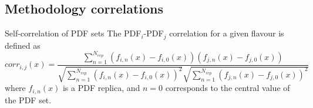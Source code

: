 \author[Roy Stegeman]{}
\subsection{Methodology correlations}

\begin{frame}[t]{Self-correlation of PDF sets}
The PDF$_i$-PDF$_j$ correlation for a given flavour is defined as
$$corr_{i,j}(x)= \frac{\sum_{n=1}^{N_{rep}} (f_{i,n}(x) -  f_{i,0}(x) )(f_{j,n}(x) -  f_{j,0}(x)) }{\sqrt{\sum_{n=1}^{N_{rep}}(f_{i,n}(x) - f_{i,0}(x))^2} \sqrt{\sum_{n=1}^{N_{rep}}(f_{j,n}(x) -  f_{j,0}(x))^2}}$$
where $f_{i,n}(x)$ is a PDF replica, and $n=0$ corresponds to the central value of the PDF set. 

\end{frame}